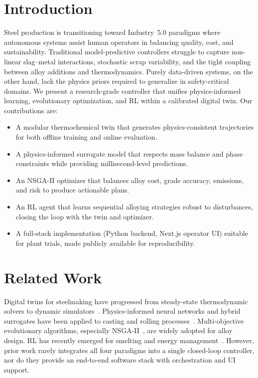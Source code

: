 \documentclass[conference]{IEEEtran}
\begin{document}
\section{Introduction}
Steel production is transitioning toward Industry~5.0 paradigms where autonomous systems assist human operators in balancing quality, cost, and sustainability. Traditional model-predictive controllers struggle to capture non-linear slag--metal interactions, stochastic scrap variability, and the tight coupling between alloy additions and thermodynamics. Purely data-driven systems, on the other hand, lack the physics priors required to generalize in safety-critical domains. We present a research-grade controller that unifies physics-informed learning, evolutionary optimization, and RL within a calibrated digital twin. Our contributions are:
\begin{itemize}
  \item A modular thermochemical twin that generates physics-consistent trajectories for both offline training and online evaluation.
  \item A physics-informed surrogate model that respects mass balance and phase constraints while providing millisecond-level predictions.
  \item An NSGA-II optimizer that balances alloy cost, grade accuracy, emissions, and risk to produce actionable plans.
  \item An RL agent that learns sequential alloying strategies robust to disturbances, closing the loop with the twin and optimizer.
  \item A full-stack implementation (Python backend, Next.js operator UI) suitable for plant trials, made publicly available for reproducibility.
\end{itemize}

\section{Related Work}
Digital twins for steelmaking have progressed from steady-state thermodynamic solvers to dynamic simulators~\cite{chen2020ladle}. Physics-informed neural networks and hybrid surrogates have been applied to casting and rolling processes~\cite{karniadakis2021pinn}. Multi-objective evolutionary algorithms, especially NSGA-II~\cite{deb2002nsga}, are widely adopted for alloy design. RL has recently emerged for smelting and energy management~\cite{wang2023rl}. However, prior work rarely integrates all four paradigms into a single closed-loop controller, nor do they provide an end-to-end software stack with orchestration and UI support.
\end{document}
